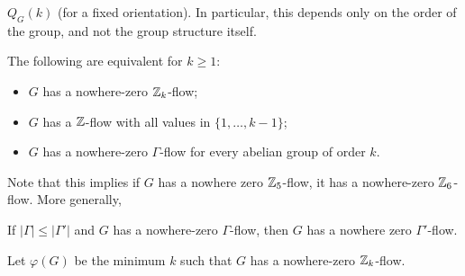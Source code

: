 \documentclass[main.tex]{subfiles}
\begin{document}
$Q_G(k)$ (for a fixed orientation).
In particular, this depends only on the order of the group, and not the group
structure itself.
\begin{corollary}
  The following are equivalent for $k\geq 1$:
  \begin{itemize}
    \item $G$ has a nowhere-zero $\mathbb Z_k$-flow;
    \item $G$ has a $\mathbb Z$-flow with all values in $\{1,\ldots,k-1\}$;
    \item $G$ has a nowhere-zero $\Gamma$-flow for every abelian group of order $k$.
  \end{itemize}
\end{corollary}
Note that this implies if $G$ has a nowhere zero $\mathbb Z_5$-flow, it has a
nowhere-zero $\mathbb Z_6$-flow.
More generally,
\begin{corollary}
  If $|\Gamma|\leq|\Gamma'|$ and $G$ has a nowhere-zero $\Gamma$-flow,
  then $G$ has a nowhere zero $\Gamma'$-flow.

  Let $\varphi(G)$ be the minimum $k$ such that $G$ has a nowhere-zero
  $\mathbb Z_k$-flow.
\end{corollary}
\end{document}
